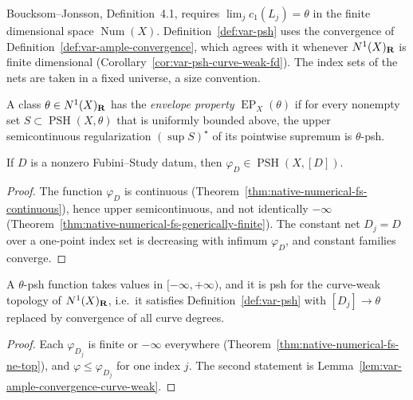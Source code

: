 \begin{remark}
\label{rmk:var-psh-source}
Boucksom--Jonsson, Definition~4.1, requires $\lim_jc_1(L_j)=\theta$ in the finite dimensional
space $\operatorname{Num}(X)$. Definition~\ref{def:var-psh} uses the convergence of
Definition~\ref{def:var-ample-convergence}, which agrees with it whenever $N^1(X)_{\mathbf{R}}$ is finite
dimensional (Corollary~\ref{cor:var-psh-curve-weak-fd}). The index sets of the nets are taken in
a fixed universe, a size convention.
\end{remark}

\begin{definition}
\label{def:var-ep}
\leanok
{}
A class $\theta\in N^1(X)_{\mathbf{R}}$ has the \emph{envelope property} $\operatorname{EP}_X(\theta)$ if
for every nonempty set $S\subset\operatorname{PSH}(X,\theta)$ that is uniformly bounded above,
the upper semicontinuous regularization $(\sup S)^\star$ of its pointwise supremum is
$\theta$-psh.
\end{definition}

\begin{lemma}
\label{lem:var-fs-psh}
\leanok
{}
If $D$ is a nonzero Fubini--Study datum, then $\varphi_D\in\operatorname{PSH}(X,[D])$.
\end{lemma}
\begin{proof}
The function $\varphi_D$ is continuous (Theorem~\ref{thm:native-numerical-fs-continuous}), hence
upper semicontinuous, and not identically $-\infty$
(Theorem~\ref{thm:native-numerical-fs-generically-finite}). The constant net $D_j=D$ over a
one-point index set is decreasing with infimum $\varphi_D$, and constant families converge.
\end{proof}

\begin{lemma}
\label{lem:var-psh-properties}
\leanok
{}
A $\theta$-psh function takes values in $[-\infty,+\infty)$, and it is psh for the curve-weak
topology of $N^1(X)_{\mathbf{R}}$, i.e.\ it satisfies Definition~\ref{def:var-psh} with
$[D_j]\to\theta$ replaced by convergence of all curve degrees.
\end{lemma}
\begin{proof}
Each $\varphi_{D_j}$ is finite or $-\infty$ everywhere
(Theorem~\ref{thm:native-numerical-fs-ne-top}), and $\varphi\le\varphi_{D_j}$ for one index
$j$. The second statement is Lemma~\ref{lem:var-ample-convergence-curve-weak}.
\end{proof}

